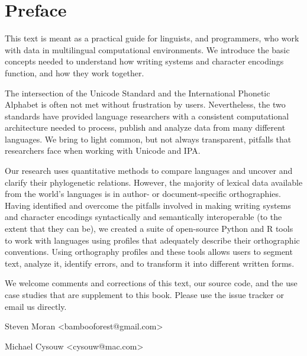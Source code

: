 \chapter{Preface}
\label{preface}

This text is meant as a practical guide for linguists, and programmers, who work with data in multilingual computational environments. We introduce the basic concepts needed to understand how writing systems and character encodings function, and how they work together.

The intersection of the Unicode Standard and the International Phonetic Alphabet is often not met without frustration by users. Nevertheless, the two standards have provided language researchers with a consistent computational architecture needed to process, publish and analyze data from many different languages. We bring to light common, but not always transparent, pitfalls that researchers face when working with Unicode and IPA. 

Our research uses quantitative methods to compare languages and uncover and clarify their phylogenetic relations. However, the majority of lexical data available from the world's languages is in author- or document-specific orthographies. Having identified and overcome the pitfalls involved in making writing systems and character encodings syntactically and semantically interoperable (to the extent that they can be), we created a suite of open-source Python and R tools to work with languages using profiles that adequately describe their orthographic conventions. Using orthography profiles and these tools allows users to segment text, analyze it, identify errors, and to transform it into different written forms.

We welcome comments and corrections of this text, our source code, and the use case studies that are supplement to this book. Please use the issue tracker or email us directly.

\bigbreak
\noindent Steven Moran {\textless}bambooforest@gmail.com{\textgreater}

\noindent Michael Cysouw {\textless}cysouw@mac.com{\textgreater}

